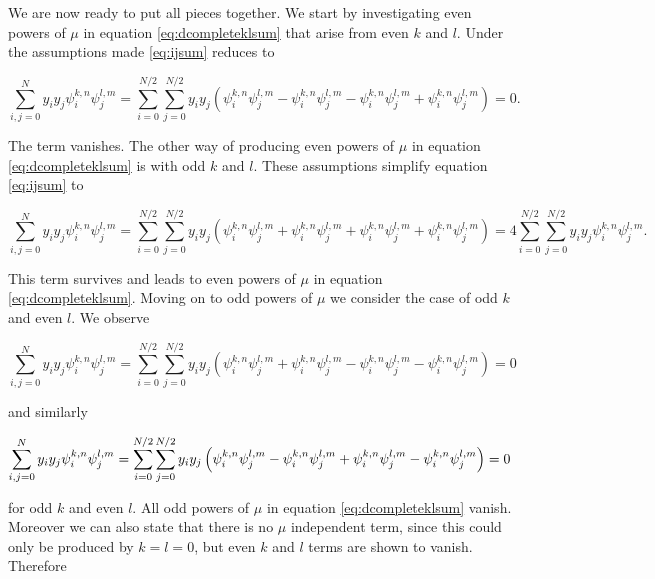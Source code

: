 \documentclass[apj]{emulateapj}
\begin{document}
We are now ready to put all pieces together. We start by investigating even powers of $\mu$ in equation \ref{eq:dcompleteklsum} that arise from even $k$ and $l$. Under the assumptions made \ref{eq:ijsum} reduces to

\begin{equation}
\sum_{i,j = 0}^N y_i y_j \psi_i^{k, n} \psi_j^{l, m} = \sum_{i = 0}^{N/2}\sum_{j = 0}^{N/2} y_i y_j  \left( \psi_i^{k, n} \psi_j^{l, m} - \psi_{i}^{k, n} \psi_j^{l, m} - \psi_i^{k, n} \psi_{j}^{l, m} + \psi_{i}^{k, n} \psi_{j}^{l, m} \right) = 0.
\end{equation}

The term vanishes. The other way of producing even powers of $\mu$ in equation \ref{eq:dcompleteklsum} is with odd $k$ and $l$. These assumptions simplify equation \ref{eq:ijsum} to

\begin{equation}
\sum_{i,j = 0}^N y_i y_j \psi_i^{k, n} \psi_j^{l, m} = \sum_{i = 0}^{N/2}\sum_{j = 0}^{N/2} y_i y_j \left( \psi_i^{k, n} \psi_j^{l, m} + \psi_{i}^{k, n} \psi_j^{l, m} + \psi_i^{k, n} \psi_{j}^{l, m} + \psi_{i}^{k, n} \psi_{j}^{l, m} \right) = 4 \sum_{i = 0}^{N/2}\sum_{j = 0}^{N/2} y_i y_j \psi_i^{k, n} \psi_j^{l, m}.
\end{equation}

This term survives and leads to even powers of $\mu$ in equation \ref{eq:dcompleteklsum}. Moving on to odd powers of $\mu$ we consider the case of odd $k$ and even $l$. We observe

\begin{equation}
\sum_{i,j = 0}^N y_i y_j \psi_i^{k, n} \psi_j^{l, m} = \sum_{i = 0}^{N/2}\sum_{j = 0}^{N/2} y_i y_j \left( \psi_i^{k, n} \psi_j^{l, m} + \psi_{i}^{k, n} \psi_j^{l, m} - \psi_i^{k, n} \psi_{j}^{l, m} - \psi_{i}^{k, n} \psi_{j}^{l, m} \right) = 0
\end{equation}

and similarly

\begin{equation}
\sum_{i,j = 0}^N y_i y_j \psi_i^{k, n} \psi_j^{l, m} = \sum_{i = 0}^{N/2}\sum_{j = 0}^{N/2} y_i y_j \left( \psi_i^{k, n} \psi_j^{l, m} - \psi_{i}^{k, n} \psi_j^{l, m} + \psi_i^{k, n} \psi_{j}^{l, m} - \psi_{i}^{k, n} \psi_{j}^{l, m} \right) = 0\\
\end{equation}

for odd $k$ and even $l$. All odd powers of $\mu$ in equation \ref{eq:dcompleteklsum} vanish. Moreover we can also state that there is no $\mu$ independent term, since this could only be produced by $k=l=0$, but even $k$ and $l$ terms are shown to vanish. Therefore
\end{document}
